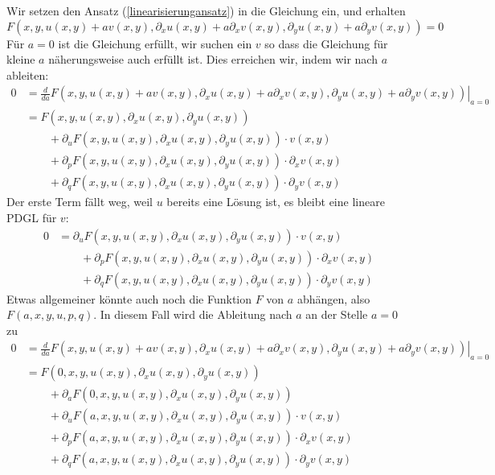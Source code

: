 Wir setzen den Ansatz (\ref{linearisierungansatz}) in die Gleichung
ein, und erhalten
\[
F(x,y,u(x,y)+av(x,y),\partial_xu(x,y)+a\partial_xv(x,y),
\partial_yu(x,y)+a\partial_yv(x,y))=0
\]
Für $a=0$ ist die Gleichung erfüllt, wir suchen ein $v$ so dass die Gleichung
für kleine $a$ näherungsweise auch erfüllt ist. Dies erreichen wir,
indem wir nach $a$ ableiten:
\begin{align*}
0&=
\left.\frac{d}{da}
F(x,y,u(x,y)+av(x,y),\partial_xu(x,y)+a\partial_xv(x,y),
\partial_yu(x,y)+a\partial_yv(x,y))\right|_{a=0}
\\
&=F(x,y,u(x,y),\partial_xu(x,y),\partial_yu(x,y))
\\
&\qquad
+
\partial_uF(x,y,u(x,y),\partial_xu(x,y),\partial_yu(x,y))\cdot v(x,y)
\\
&\qquad
+
\partial_pF(x,y,u(x,y),\partial_xu(x,y),\partial_yu(x,y))\cdot \partial_xv(x,y)
\\
&\qquad
+
\partial_qF(x,y,u(x,y),\partial_xu(x,y),\partial_yu(x,y))\cdot \partial_yv(x,y)
\end{align*}
Der erste Term fällt weg, weil $u$ bereits eine Lösung ist,
es bleibt eine lineare PDGL für $v$:
\begin{align*}
0&=
\partial_uF(x,y,u(x,y),\partial_xu(x,y),\partial_yu(x,y))\cdot v(x,y)
\\
&\qquad
+
\partial_pF(x,y,u(x,y),\partial_xu(x,y),\partial_yu(x,y))\cdot \partial_xv(x,y)
\\
&\qquad
+
\partial_qF(x,y,u(x,y),\partial_xu(x,y),\partial_yu(x,y))\cdot \partial_yv(x,y)
\end{align*}
Etwas allgemeiner könnte auch noch die Funktion $F$ von $a$ abhängen,
also $F(a,x,y,u,p,q)$. In diesem Fall wird die Ableitung nach $a$ an
der Stelle $a=0$ zu
\begin{align*}
0&=
\left.\frac{d}{da}
F(x,y,u(x,y)+av(x,y),\partial_xu(x,y)+a\partial_xv(x,y),
\partial_yu(x,y)+a\partial_yv(x,y))\right|_{a=0}
\\
&=
F(0,x,y,u(x,y),\partial_xu(x,y),\partial_yu(x,y))
\\
&\qquad
+\partial_aF(0,x,y,u(x,y),\partial_xu(x,y),\partial_yu(x,y))
\\
&\qquad
+
\partial_uF(a,x,y,u(x,y),\partial_xu(x,y),\partial_yu(x,y))\cdot v(x,y)
\\
&\qquad
+
\partial_pF(a,x,y,u(x,y),\partial_xu(x,y),\partial_yu(x,y))\cdot \partial_xv(x,y)
\\
&\qquad
+
\partial_qF(a,x,y,u(x,y),\partial_xu(x,y),\partial_yu(x,y))\cdot \partial_yv(x,y)
\end{align*}
